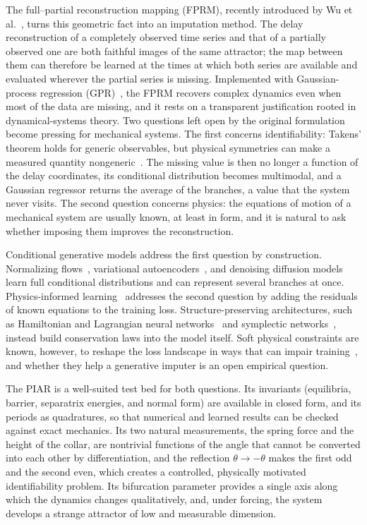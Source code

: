 The full--partial reconstruction mapping (FPRM), recently introduced by Wu et al.~\cite{Wu2026FPRM}, turns this geometric fact into an imputation method. The delay reconstruction of a completely observed time series and that of a partially observed one are both faithful images of the same attractor; the map between them can therefore be learned at the times at which both series are available and evaluated wherever the partial series is missing. Implemented with Gaussian-process regression (GPR)~\cite{Rasmussen2006}, the FPRM recovers complex dynamics even when most of the data are missing, and it rests on a transparent justification rooted in dynamical-systems theory. Two questions left open by the original formulation become pressing for mechanical systems. The first concerns identifiability: Takens' theorem holds for generic observables, but physical symmetries can make a measured quantity nongeneric~\cite{LetellierAguirre2002,Letellier2005}. The missing value is then no longer a function of the delay coordinates, its conditional distribution becomes multimodal, and a Gaussian regressor returns the average of the branches, a value that the system never visits. The second question concerns physics: the equations of motion of a mechanical system are usually known, at least in form, and it is natural to ask whether imposing them improves the reconstruction.

Conditional generative models address the first question by construction. Normalizing flows~\cite{Papamakarios2021,Durkan2019}, variational autoencoders~\cite{Kingma2014,Sohn2015}, and denoising diffusion models~\cite{Ho2020,NicholDhariwal2021} learn full conditional distributions and can represent several branches at once. Physics-informed learning~\cite{Raissi2019,Karniadakis2021} addresses the second question by adding the residuals of known equations to the training loss. Structure-preserving architectures, such as Hamiltonian and Lagrangian neural networks~\cite{Greydanus2019,Cranmer2020} and symplectic networks~\cite{Jin2020}, instead build conservation laws into the model itself. Soft physical constraints are known, however, to reshape the loss landscape in ways that can impair training~\cite{Krishnapriyan2021,WangTengPerdikaris2021}, and whether they help a generative imputer is an open empirical question.

The PIAR is a well-suited test bed for both questions. Its invariants (equilibria, barrier, separatrix energies, and normal form) are available in closed form, and its periods as quadratures, so that numerical and learned results can be checked against exact mechanics. Its two natural measurements, the spring force and the height of the collar, are nontrivial functions of the angle that cannot be converted into each other by differentiation, and the reflection $\theta\to-\theta$ makes the first odd and the second even, which creates a controlled, physically motivated identifiability problem. Its bifurcation parameter provides a single axis along which the dynamics changes qualitatively, and, under forcing, the system develops a strange attractor of low and measurable dimension.

